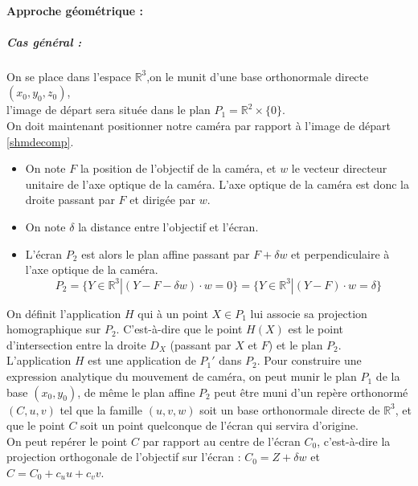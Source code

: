 \paragraph{Approche géométrique :}
\subparagraph{Cas général :}
On se place dans l'espace $\mathbb{R}^{3}$,on le munit d'une base orthonormale directe $(x_{0},y_{0},z_{0})$,\\ l'image de départ sera située dans le plan $P_{1}= \mathbb{R}^{2}\times \{0\}$.\\
On doit maintenant positionner notre caméra par rapport à l'image de départ \ref{shmdecomp}.
\begin{itemize}
\item On note $F$ la position de l'objectif de la caméra, et $w$ le vecteur directeur unitaire de l'axe optique de la caméra. L'axe optique de la caméra est donc la droite passant par $F$ et dirigée par $w$.
\item On note $\delta$ la distance entre l'objectif et l'écran.
\item L'écran $P_{2}$ est alors le plan affine passant par $F+\delta w$ et perpendiculaire à l'axe optique de la caméra.
\begin{equation*}
P_{2}=\{Y\in \mathbb{R}^{3}|(Y-F-\delta w)\cdot w=0\}=\{Y\in \mathbb{R}^{3}|(Y-F)\cdot w=\delta\}
\end{equation*}
\end{itemize}

On définit l'application $H$ qui à un point $X\in P_{1}$ lui associe sa projection homographique sur $P_{2}$. C'est-à-dire que le point $H(X)$ est le point d'intersection entre la droite $D_{X}$ (passant par $X$ et $F$) et le plan $P_{2}$.\\

L'application $H$ est une application de $P_{1}'$ dans $P_{2}$. Pour construire une expression analytique du mouvement de caméra, on peut munir le plan $P_{1}$ de la base $(x_{0},y_{0})$, de même le plan affine $P_{2}$ peut être muni d'un repère orthonormé $(C,u,v)$ tel que la famille $(u,v,w)$ soit un base orthonormale directe de $\mathbb{R}^{3}$, et que le point $C$ soit un point quelconque de l'écran qui servira d'origine.\\

On peut repérer le point $C$ par rapport au centre de l'écran $C_{0}$, c'est-à-dire la projection orthogonale de l'objectif sur l'écran : $C_{0}=Z+\delta w$ et $C=C_{0}+c_{u}u+c_{v}v$.\\


